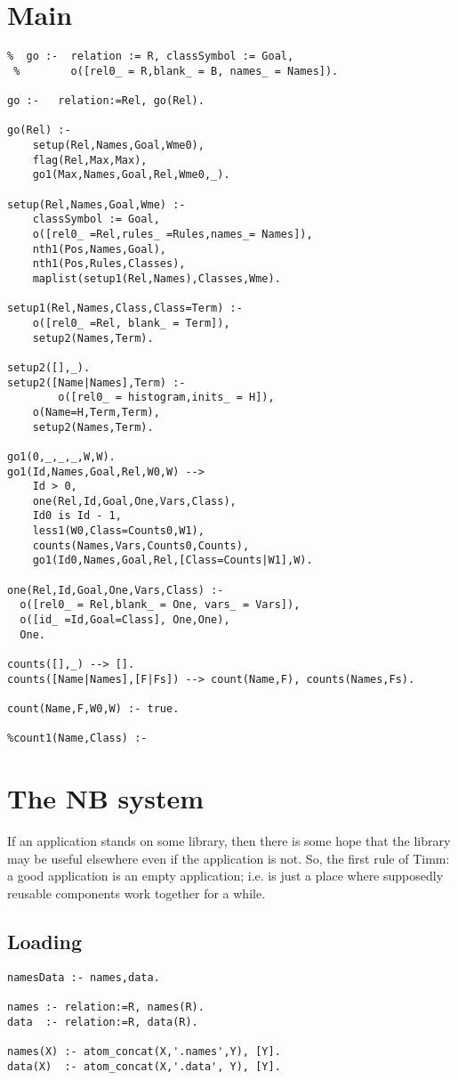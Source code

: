\documentclass[twocolumn,10pt]{book}
\begin{document}
\section{ Main }\begin{Verbatim}
%  go :-  relation := R, classSymbol := Goal,
 %        o([rel0_ = R,blank_ = B, names_ = Names]).

go :-   relation:=Rel, go(Rel).

go(Rel) :-
    setup(Rel,Names,Goal,Wme0),
    flag(Rel,Max,Max),
    go1(Max,Names,Goal,Rel,Wme0,_).

setup(Rel,Names,Goal,Wme) :-
    classSymbol := Goal,
    o([rel0_ =Rel,rules_ =Rules,names_= Names]),
    nth1(Pos,Names,Goal),
    nth1(Pos,Rules,Classes),
    maplist(setup1(Rel,Names),Classes,Wme).

setup1(Rel,Names,Class,Class=Term) :-
    o([rel0_ =Rel, blank_ = Term]),
    setup2(Names,Term).

setup2([],_).
setup2([Name|Names],Term) :-
        o([rel0_ = histogram,inits_ = H]),
    o(Name=H,Term,Term),
    setup2(Names,Term).

go1(0,_,_,_,W,W).
go1(Id,Names,Goal,Rel,W0,W) -->
    Id > 0,
    one(Rel,Id,Goal,One,Vars,Class),
    Id0 is Id - 1,
    less1(W0,Class=Counts0,W1),
    counts(Names,Vars,Counts0,Counts),
    go1(Id0,Names,Goal,Rel,[Class=Counts|W1],W).

one(Rel,Id,Goal,One,Vars,Class) :-
  o([rel0_ = Rel,blank_ = One, vars_ = Vars]),
  o([id_ =Id,Goal=Class], One,One),
  One.

counts([],_) --> [].
counts([Name|Names],[F|Fs]) --> count(Name,F), counts(Names,Fs).

count(Name,F,W0,W) :- true.

%count1(Name,Class) :-

\end{Verbatim}
\section{ The NB system
}
  If an application stands on some library,
    then there is some hope that the library
    may be useful elsewhere even if the application
is not. So, the first rule of Timm: a good application is an empty
application; i.e. is just a place where
supposedly reusable components work together for a while.

\subsection{ Loading }\begin{Verbatim}
namesData :- names,data.

names :- relation:=R, names(R).
data  :- relation:=R, data(R).

names(X) :- atom_concat(X,'.names',Y), [Y].
data(X)  :- atom_concat(X,'.data', Y), [Y].
\end{Verbatim}
\end{document}
